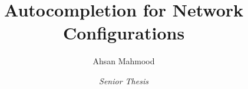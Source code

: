\documentclass[letterpaper,11pt]{article}
\begin{document}
\title{Autocompletion for Network Configurations}
\author{Ahsan Mahmood}
\date{\em Senior Thesis}
\maketitle





\pagebreak





\begin{small}


\end{small}
\end{document}
